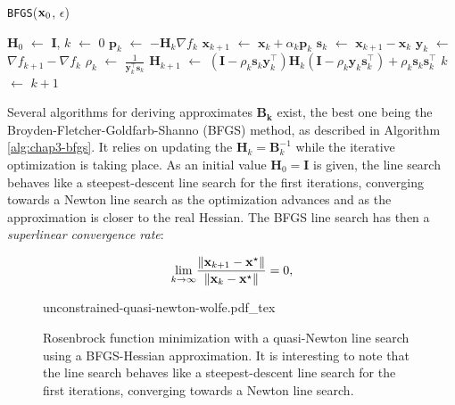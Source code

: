 \begin{algorithm}
\caption{\texttt{BFGS}($\mathbf{x}_0$, $\epsilon$)}
\label{alg:chap3-bfgs}
\begin{algorithmic}
\STATE $\mathbf{H}_0$ $\leftarrow$ $\mathbf{I}$, $k$ $\leftarrow$ $0$
\STATE $\mathbf{p}_k$ $\leftarrow$ $-\mathbf{H}_k\nabla f_k$
\STATE $\mathbf{x}_{k+1}$ $\leftarrow$ $\mathbf{x}_k + \alpha_k\mathbf{p}_k$
\STATE $\mathbf{s}_k$ $\leftarrow$ $\mathbf{x}_{k+1} - \mathbf{x}_k$
\STATE $\mathbf{y}_k$ $\leftarrow$ $\nabla f_{k+1} - \nabla f_k$
\STATE $\rho_k$ $\leftarrow$ $\frac{1}{\mathbf{y}_k^{\top}\mathbf{s}_k}$
\STATE $\mathbf{H}_{k+1}$ $\leftarrow$ $(\mathbf{I}-\rho_k\mathbf{s}_k\mathbf{y}_k^{\top})\mathbf{H}_k(\mathbf{I}-\rho_k\mathbf{y}_k\mathbf{s}_k^{\top})+\rho_k\mathbf{s}_k\mathbf{s}_k^{\top}$
\STATE $k$ $\leftarrow$ $k + 1$
\ENDWHILE
\end{algorithmic}
\end{algorithm}

Several algorithms for deriving approximates $\mathbf{B_k}$ exist, the
best one being the Broyden-Fletcher-Goldfarb-Shanno (BFGS) method, as
described in Algorithm \ref{alg:chap3-bfgs}. It relies on updating the
$\mathbf{H}_k = \mathbf{B}_k^{-1}$ while the iterative optimization is
taking place. As an initial value $\mathbf{H}_0=\mathbf{I}$ is given,
the line search behaves like a steepest-descent line search for the
first iterations, converging towards a Newton line search as the
optimization advances and as the approximation is closer to the real
Hessian. The BFGS line search has then a \emph{superlinear
  convergence rate}:

\begin{equation}
\underset{k\rightarrow\infty}{\text{lim}}
\frac{\left\lVert \mathbf{x}_{k+1}-\mathbf{x}^{\star} \right\rVert}{\left\lVert \mathbf{x}_k-\mathbf{x}^{\star} \right\rVert}
= 0,
\end{equation}

\begin{figure}
  \centering
      {\def\svgwidth{0.8\linewidth}
        {\footnotesize
          
                     {unconstrained-quasi-newton-wolfe.pdf_tex}
        }
      }
      \caption{Rosenbrock function minimization with a quasi-Newton
        line search using a BFGS-Hessian approximation. It is
        interesting to note that the line search behaves like a
        steepest-descent line search for the first iterations,
        converging towards a Newton line search.}
      \label{fig:chap3-unconstrained-quasi-newton-wolfe}
\end{figure}

